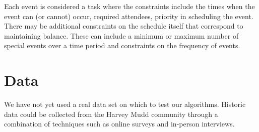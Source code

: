 \documentclass{article}
\begin{document}
		Each event is considered a task where the constraints include the times when the event can (or cannot) occur, required attendees, priority in scheduling the event.
		There may be additional constraints on the schedule itself that correspond to maintaining balance.
		These can include a minimum or maximum number of special events over a time period and constraints on the frequency of events.


\section{Data}
	We have not yet used a real data set on which to test our algorithms.
	Historic data could be collected from the Harvey Mudd community through a combination of techniques such as online surveys and in-person interviews.








\end{document}
